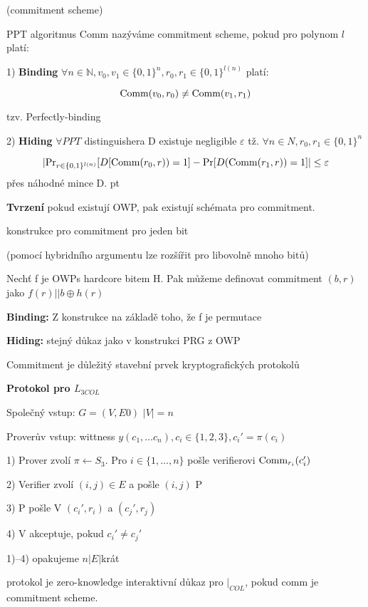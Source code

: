 \documentclass[a4paper,12pt,titlepage]{article}
\def\podnadpis#1{{\bigskip\bf\noindent#1\medskip\par}}
\def\definice{\noindent {\bf Definice: }}
\def\tvrzeni{\noindent {\bf Tvrzení: }}
\def\dukaz{\noindent {\bf Důkaz: }}
\def\Comm{{\rm Comm}}
\begin{document}
\definice(commitment scheme)

PPT algoritmus Comm nazýváme commitment scheme, pokud pro polynom $l$ platí:

1) {\bf Binding} $\forall n\in\mathbb{N},v_0,v_1\in\{0,1\}^n,r_0,r_1\in\{0,1\}^{l(n)}$ platí:

$$\Comm(v_0,r_0)\neq \Comm(v_1,r_1)$$

tzv. Perfectly-binding

2) {\bf Hiding} $\forall PPT$ distinguishera D existuje negligible $\varepsilon$ tž. $\forall n\in N,r_0,r_1\in\{0,1\}^n$

$$|{\rm Pr}_{r\in\{0,1\}^{l(n)}}[D[\Comm(r_0,r))=1]-{\rm Pr}[D(\Comm(r_1,r))=1]|\leq\varepsilon$$ přes náhodné mince D.
 pt

{\noindent \bf Tvrzení} pokud existují OWP, pak existují schémata pro commitment.

\dukaz konstrukce pro commitment pro jeden bit

(pomocí hybridního argumentu lze rozšířit pro libovolně mnoho bitů)

Nechť f je OWPs hardcore bitem H. Pak můžeme definovat commitment $(b,r)$ jako $f(r)||b\oplus h(r)$

{\bf Binding:} Z konstrukce na základě toho, že f je permutace

{\bf Hiding:} stejný důkaz jako v konstrukci PRG z OWP

\vskip 5pt


Commitment je důležitý stavební prvek kryptografických protokolů

\podnadpis{Protokol pro $L_{3COL}$}

Společný vstup: $G=(V,E0)$ $|V|=n$

Proverův vstup: wittness $y(c_1,\dots c_n), c_i\in \{1,2,3\}, c_i'=\pi(c_i)$

1) Prover zvolí $\pi\leftarrow S_3$. Pro $i\in\{1,\dots,n\}$ pošle verifierovi $\Comm_{r_i}(c_i')$

2) Verifier zvolí $(i,j)\in E$ a pošle $(i,j)$ P

3) P pošle V $(c_i',r_i)$ a $(c_j',r_j)$

4) V akceptuje, pokud $c_i'\neq c_j'$
\vskip 5pt

1)--4) opakujeme $n|E|$krát
\vskip 10pt

\tvrzeni protokol je zero-knowledge interaktivní důkaz pro $|_{COL}$, pokud comm je commitment scheme.
\end{document}
